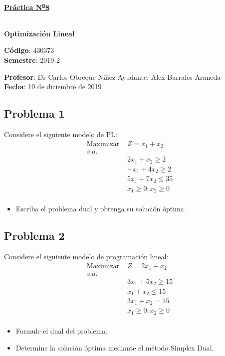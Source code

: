 \documentclass[letterpaper]{article}
\begin{document}
\vspace*{0.5\baselineskip}
\begin{center}
\begin{Large}
\textbf{\underline{Práctica N\textsuperscript{\underline{o}}8}}
\end{Large}\\
\vspace*{0.5\baselineskip}
\textbf{Optimización Lineal} \\
\vspace*{0.5\baselineskip}
\begin{footnotesize}
\textbf{Código}: 430373\\
\textbf{Semestre}: 2019-2
\end{footnotesize}
\end{center}

\noindent \textbf{Profesor}: Dr Carlos Obreque Niñez  \hfill Ayudante: Alex Barrales Araneda\\
\noindent \textbf{Fecha}: 10 de diciembre de 2019

\subsection*{Problema 1}
Considere el siguiente modelo de PL:
\begin{align*}
\mbox{Maximizar }&Z = x_1 + x_2\\
s.a.\\
&2x_1 + x_2 \geq 2\\
&-x_1 + 4x_2 \geq 2\\
&5x_1 + 7x_2 \leq 35\\
&x_1 \geq 0 ; x_2 \geq 0\\
\end{align*}

\begin{itemize}
\item Escriba el problema dual y obtenga su solución óptima.
\end{itemize}
\subsection*{Problema 2}
Considere el siguiente modelo de programación lineal:
\begin{align*}
\mbox{Maximizar }&Z = 2x_1 + x_2 \\
s.a.\\
&3x_1 + 5x_2 \geq 15\\
&x_1 + x_2 \leq 15\\
&3x_1 + x_2  = 15\\
&x_1 \geq 0 ;x_2 \geq 0\\
\end{align*}

\begin{itemize}
\item Formule el dual del problema.
\item Determine la solución óptima mediante el método Simplex Dual.
\end{itemize}

\newpage


 
\end{document}
